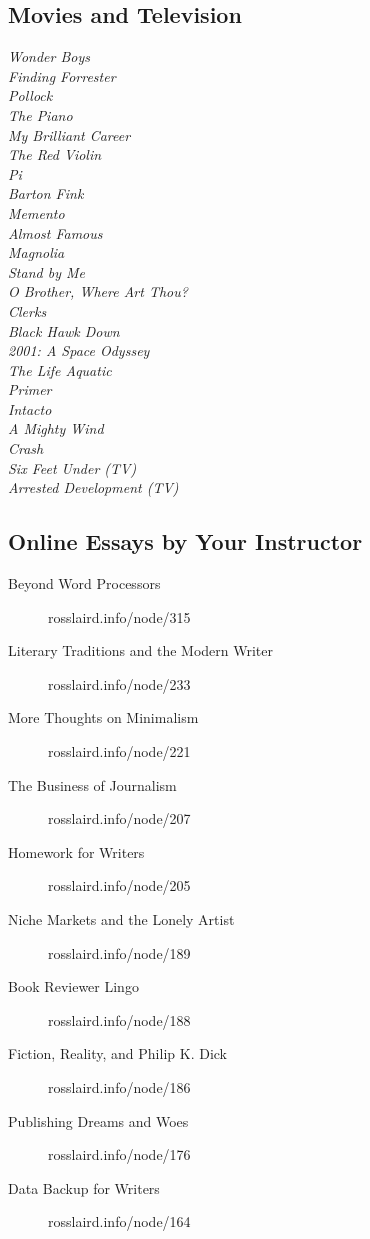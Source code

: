 \documentclass[letterpaper,10pt,headsepline]{scrreprt}
\begin{document}
\subsection{Movies and Television}
\textit{Wonder Boys\\
Finding Forrester\\
Pollock\\
The Piano\\
My Brilliant Career\\
The Red Violin\\
Pi\\
Barton Fink\\
Memento\\
Almost Famous\\
Magnolia\\
Stand by Me\\
O Brother, Where Art Thou?\\
Clerks\\
Black Hawk Down\\
2001: A Space Odyssey\\
The Life Aquatic\\
Primer\\
Intacto\\
A Mighty Wind\\
Crash\\
Six Feet Under (TV)\\
Arrested Development (TV)\/}\\

\subsection{Online Essays by Your Instructor}
  \begin{description}
  \item [Beyond Word Processors] rosslaird.info/node/315
  \item [Literary Traditions and the Modern Writer]  rosslaird.info/node/233
\item [More Thoughts on Minimalism] rosslaird.info/node/221
\item [The Business of Journalism] rosslaird.info/node/207 
\item [Homework for Writers] rosslaird.info/node/205
\item [Niche Markets and the Lonely Artist] rosslaird.info/node/189
\item [Book Reviewer Lingo] rosslaird.info/node/188
\item [Fiction, Reality, and Philip K. Dick] rosslaird.info/node/186
\item [Publishing Dreams and Woes] rosslaird.info/node/176
\item [Data Backup for Writers] rosslaird.info/node/164
  \end{description}
\end{document}

